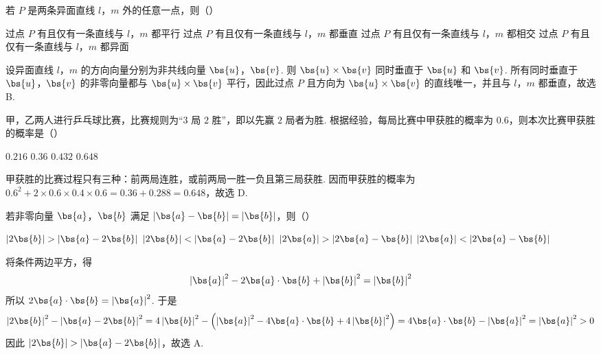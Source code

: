 \begin{problem}
若 \(P\) 是两条异面直线 \(l\)，\(m\) 外的任意一点，则（\quad）

\choices
    {过点 \(P\) 有且仅有一条直线与 \(l\)，\(m\) 都平行}
    {过点 \(P\) 有且仅有一条直线与 \(l\)，\(m\) 都垂直}
    {过点 \(P\) 有且仅有一条直线与 \(l\)，\(m\) 都相交}
    {过点 \(P\) 有且仅有一条直线与 \(l\)，\(m\) 都异面}
\end{problem}

\begin{solution}
设异面直线 \(l\)，\(m\) 的方向向量分别为非共线向量 \(\bs{u}\)，\(\bs{v}\). 则 \(\bs{u}\times\bs{v}\) 同时垂直于 \(\bs{u}\) 和 \(\bs{v}\). 所有同时垂直于 \(\bs{u}\)，\(\bs{v}\) 的非零向量都与 \(\bs{u}\times\bs{v}\) 平行，因此过点 \(P\) 且方向为 \(\bs{u}\times\bs{v}\) 的直线唯一，并且与 \(l\)，\(m\) 都垂直，故选 B.
\end{solution}

\begin{problem}
甲，乙两人进行乒乓球比赛，比赛规则为“\(3\) 局 \(2\) 胜”，即以先赢 \(2\) 局者为胜. 根据经验，每局比赛中甲获胜的概率为 \(0.6\)，则本次比赛甲获胜的概率是（\quad）

\choices
    {\(0.216\)}
    {\(0.36\)}
    {\(0.432\)}
    {\(0.648\)}
\end{problem}

\begin{solution}
甲获胜的比赛过程只有三种：前两局连胜，或前两局一胜一负且第三局获胜. 因而甲获胜的概率为 \(0.6^2+2\times0.6\times0.4\times0.6=0.36+0.288=0.648\)，故选 D.
\end{solution}

\begin{problem}
若非零向量 \(\bs{a}\)，\(\bs{b}\) 满足 \(\left|\bs{a} - \bs{b}\right| = \left|\bs{b}\right|\)，则（\quad）

\choices
    {\(\left|2\bs{b}\right| > \left|\bs{a} - 2\bs{b}\right|\)}
    {\(\left|2\bs{b}\right| < \left|\bs{a} - 2\bs{b}\right|\)}
    {\(\left|2\bs{a}\right| > \left|2\bs{a} - \bs{b}\right|\)}
    {\(\left|2\bs{a}\right| < \left|2\bs{a} - \bs{b}\right|\)}
\end{problem}

\begin{solution}
将条件两边平方，得
\[
\left|\bs{a}\right|^2-2\bs{a}\cdot\bs{b}+\left|\bs{b}\right|^2=\left|\bs{b}\right|^2
\]
所以 \(2\bs{a}\cdot\bs{b}=\left|\bs{a}\right|^2\). 于是
\[
\left|2\bs{b}\right|^2-\left|\bs{a}-2\bs{b}\right|^2=4\left|\bs{b}\right|^2-\left(\left|\bs{a}\right|^2-4\bs{a}\cdot\bs{b}+4\left|\bs{b}\right|^2\right)=4\bs{a}\cdot\bs{b}-\left|\bs{a}\right|^2=\left|\bs{a}\right|^2>0
\]
因此 \(\left|2\bs{b}\right|>\left|\bs{a}-2\bs{b}\right|\)，故选 A.
\end{solution}

